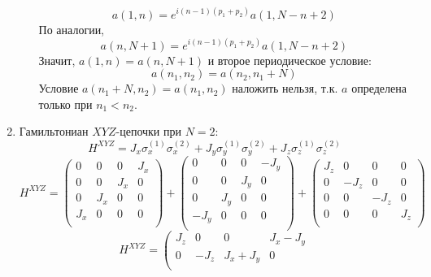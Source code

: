 \documentclass[12pt]{article}
\begin{document}
\begin{enumerate}
\begin{itemize}
\begin{equation}
            a(1,n)=e^{i(n-1)(p_1+p_2)}a(1,N-n+2)
        \end{equation}
        По аналогии,
        \begin{equation}
            a(n,N+1)=e^{i(n-1)(p_1+p_2)}a(1,N-n+2)
        \end{equation}
        Значит, $a(1,n)=a(n,N+1)$ и второе периодическое условие:
        \begin{equation}
            \boxed{a(n_1,n_2)=a(n_2,n_1+N)}
        \end{equation}
        Условие $a(n_1+N,n_2)=a(n_1,n_2)$ наложить нельзя, т.к. $a$ определена только при $n_1<n_2$.
    \end{itemize}
    \item Гамильтониан $XYZ$-цепочки при $N=2$:
    \begin{equation}
        H^{XYZ}=J_x\sigma_x^{(1)}\sigma_x^{(2)}+J_y\sigma_y^{(1)}\sigma_y^{(2)}+J_z\sigma_z^{(1)}\sigma_z^{(2)}
    \end{equation}
    \begin{equation}
        H^{XYZ}=\left(\begin{array}{cccc}
        0 & 0 & 0 & J_x\\
        0 & 0 & J_x & 0\\
        0 & J_x & 0 & 0\\
        J_x & 0 & 0 & 0\\
        \end{array}\right)+\left(\begin{array}{cccc}
        0 & 0 & 0 & -J_y\\
        0 & 0 & J_y & 0\\
        0 & J_y & 0 & 0\\
        -J_y & 0 & 0 & 0\\
        \end{array}\right)+\left(\begin{array}{cccc}
        J_z & 0 & 0 & 0\\
        0 & -J_z & 0 & 0\\
        0 & 0 & -J_z & 0\\
        0 & 0 & 0 & J_z\\
        \end{array}\right)
    \end{equation}
    \begin{equation}
        H^{XYZ}=\left(\begin{array}{cccc}
        J_z & 0 & 0 & J_x-J_y\\
        0 & -J_z & J_x+J_y & 0\\

\end{array}
\end{equation}
\end{enumerate}
\end{document}
